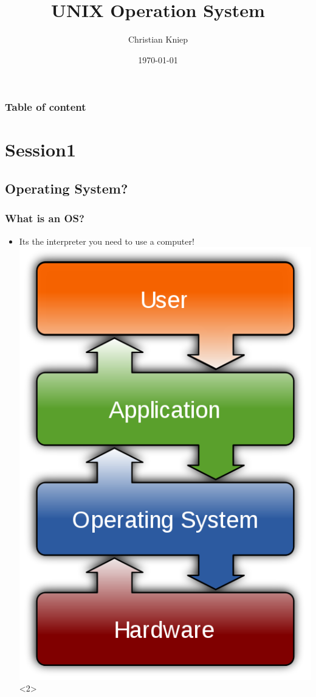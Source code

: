 \documentclass[hyperref={pdfpagelabels=false}]{beamer}
\author{Christian Kniep}
\begin{document}
\title[UNIX]{UNIX Operation System}  
\date[\today]{\today} 

\begin{frame}
	\titlepage
\end{frame} 

\begin{frame}
	\frametitle{Table of content}
	\tableofcontents
\end{frame} 


\section{Session1} 
	\subsection{Operating System?}
		\begin{frame}
			\frametitle{What is an OS?}
			\begin{itemize}
				\item<1-> Its the interpreter you need to use a computer!
				\includegraphics[height=0.5\columnwidth]{pics/OS.png}<2>%
            \end{itemize}
		\end{frame}
\end{document}
